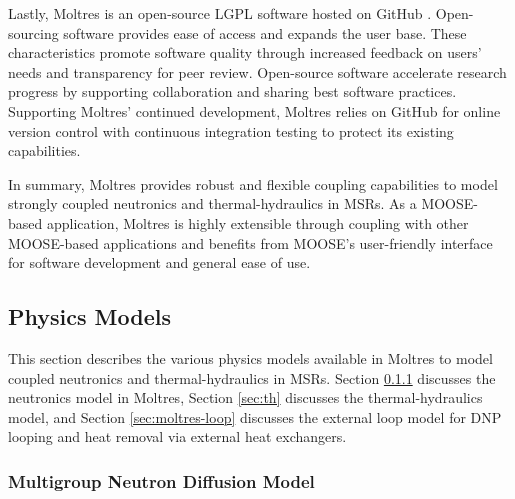 Lastly, Moltres is an open-source \gls{LGPL} software hosted on
GitHub \cite{github_build_2017}. Open-sourcing software provides ease of access
and expands the user base. These characteristics promote software quality
through increased feedback on users' needs and transparency for peer review.
Open-source software accelerate research progress by supporting
collaboration and sharing best software practices. Supporting Moltres'
continued development, Moltres relies on GitHub for online version control with
continuous integration testing to protect its existing capabilities.

In summary, Moltres provides robust and flexible coupling capabilities to
model strongly coupled neutronics and thermal-hydraulics in \glspl{MSR}. As a
MOOSE-based application, Moltres is highly extensible through coupling with
other MOOSE-based applications and benefits from MOOSE's user-friendly
interface for software development and general ease of use.

\subsection{Physics Models} \label{sec:moltres-physics}

This section describes the various physics models available in Moltres to model
coupled neutronics and thermal-hydraulics in \glspl{MSR}. Section \ref{sec:nts}
discusses the neutronics model in Moltres, Section \ref{sec:th} discusses
the thermal-hydraulics model, and Section \ref{sec:moltres-loop} discusses the
external loop model for \gls{DNP} looping and heat removal via external heat
exchangers.

\subsubsection{Multigroup Neutron Diffusion Model} \label{sec:nts}

